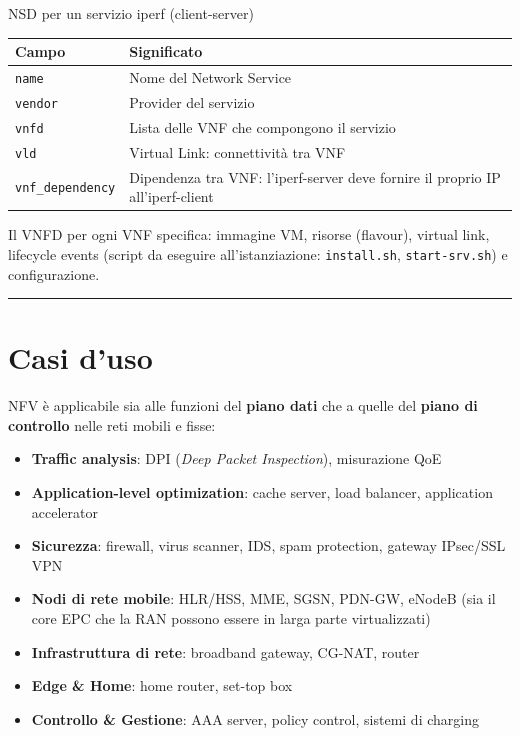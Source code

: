 \documentclass[
  italian,
  openany]{book}
\newcounter{none} %
\providecommand{\tightlist}{%
  \setlength{\itemsep}{0pt}\setlength{\parskip}{0pt}}
\begin{document}
\begin{callouttip}{NSD per un servizio iperf (client-server)}
{\def\LTcaptype{none} %
\begin{longtable}[]{@{}
  >{\raggedright\arraybackslash}p{}
  >{\raggedright\arraybackslash}p{}@{}}
\toprule\noalign{}
\begin{minipage}[b]{\linewidth}\raggedright
Campo
\end{minipage} & \begin{minipage}[b]{\linewidth}\raggedright
Significato
\end{minipage} \\
\midrule\noalign{}
\endhead
\bottomrule\noalign{}
\endlastfoot
\texttt{name} & Nome del Network Service \\
\texttt{vendor} & Provider del servizio \\
\texttt{vnfd} & Lista delle VNF che compongono il servizio \\
\texttt{vld} & Virtual Link: connettività tra VNF \\
\texttt{vnf\_dependency} & Dipendenza tra VNF: l'iperf-server deve
fornire il proprio IP all'iperf-client \\
\end{longtable}
}

\end{callouttip}

Il VNFD per ogni VNF specifica: immagine VM, risorse (flavour), virtual
link, lifecycle events (script da eseguire all'istanziazione:
\texttt{install.sh}, \texttt{start-srv.sh}) e configurazione.

\begin{center}\rule{0.5\linewidth}{0.5pt}\end{center}

\section{Casi d'uso}\label{casi-duso}

NFV è applicabile sia alle funzioni del \textbf{piano dati} che a quelle
del \textbf{piano di controllo} nelle reti mobili e fisse:

\begin{itemize}
\tightlist
\item
  \textbf{Traffic analysis}: DPI (\emph{Deep Packet Inspection}),
  misurazione QoE
\item
  \textbf{Application-level optimization}: cache server, load balancer,
  application accelerator
\item
  \textbf{Sicurezza}: firewall, virus scanner, IDS, spam protection,
  gateway IPsec/SSL VPN
\item
  \textbf{Nodi di rete mobile}: HLR/HSS, MME, SGSN, PDN-GW, eNodeB (sia
  il core EPC che la RAN possono essere in larga parte virtualizzati)
\item
  \textbf{Infrastruttura di rete}: broadband gateway, CG-NAT, router
\item
  \textbf{Edge \& Home}: home router, set-top box
\item
  \textbf{Controllo \& Gestione}: AAA server, policy control, sistemi di
  charging
\end{itemize}
\end{document}
